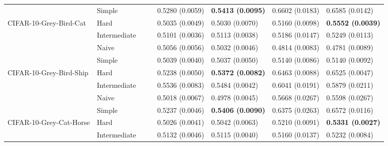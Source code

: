 \begin{tabular}{llllllll}
                 & Simple &                           &                           &           0.5280 (0.0059) &  \textbf{0.5413 (0.0095)} &           0.6602 (0.0183) &           0.6585 (0.0142) \\
CIFAR-10-Grey-Bird-Cat & Hard &                           &                           &           0.5035 (0.0049) &           0.5030 (0.0070) &           0.5160 (0.0098) &  \textbf{0.5552 (0.0039)} \\
                 & Intermediate &                           &                           &           0.5101 (0.0036) &           0.5113 (0.0038) &           0.5186 (0.0147) &           0.5249 (0.0113) \\
                 & Naive &                           &                           &           0.5056 (0.0056) &           0.5032 (0.0046) &           0.4814 (0.0083) &           0.4781 (0.0089) \\
                 & Simple &                           &                           &           0.5039 (0.0040) &           0.5037 (0.0050) &           0.5140 (0.0086) &           0.5140 (0.0092) \\
CIFAR-10-Grey-Bird-Ship & Hard &                           &                           &           0.5238 (0.0050) &  \textbf{0.5372 (0.0082)} &           0.6463 (0.0088) &           0.6525 (0.0047) \\
                 & Intermediate &                           &                           &           0.5536 (0.0083) &           0.5484 (0.0042) &           0.6041 (0.0191) &           0.5879 (0.0211) \\
                 & Naive &                           &                           &           0.5018 (0.0067) &           0.4978 (0.0045) &           0.5668 (0.0267) &           0.5598 (0.0267) \\
                 & Simple &                           &                           &           0.5237 (0.0046) &  \textbf{0.5406 (0.0090)} &           0.6375 (0.0263) &           0.6572 (0.0116) \\
CIFAR-10-Grey-Cat-Horse & Hard &                           &                           &           0.5026 (0.0041) &           0.5042 (0.0063) &           0.5210 (0.0091) &  \textbf{0.5331 (0.0027)} \\
                 & Intermediate &                           &                           &           0.5132 (0.0046) &           0.5115 (0.0040) &           0.5160 (0.0137) &           0.5232 (0.0084) \\

\end{tabular}
